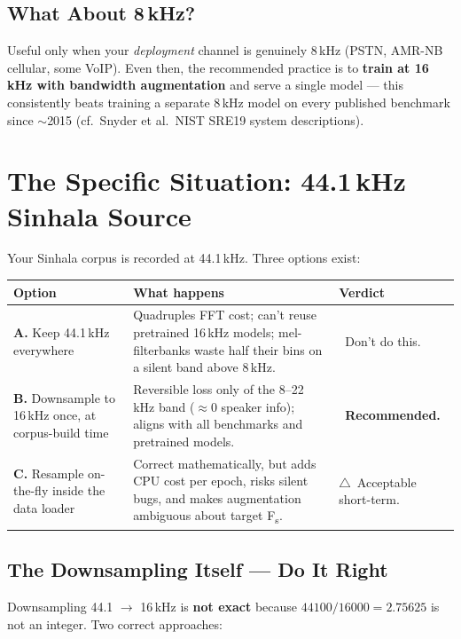 \documentclass[11pt,a4paper]{article}
\newcommand{\yes}{\textcolor{green!60!black}{\checkmark}}
\newcommand{\no}{\textcolor{red}{\texttimes}}
\newcommand{\maybe}{$\triangle$}
\begin{document}
\subsection{What About 8\,kHz?}

Useful only when your \emph{deployment} channel is genuinely 8\,kHz (PSTN, AMR-NB cellular, some
VoIP). Even then, the recommended practice is to \textbf{train at 16\,kHz with bandwidth
augmentation} and serve a single model --- this consistently beats training a separate 8\,kHz model
on every published benchmark since $\sim$2015 (cf.\ Snyder et al.\ NIST SRE19 system descriptions).

\section{The Specific Situation: 44.1\,kHz Sinhala Source}
\label{sec:sinhala}

Your Sinhala corpus is recorded at 44.1\,kHz. Three options exist:

\begin{center}
\begin{tabular}{p{3cm}p{7cm}p{2cm}}
\toprule
Option & What happens & Verdict \\
\midrule
\textbf{A.} Keep 44.1\,kHz everywhere &
  Quadruples FFT cost; can't reuse pretrained 16\,kHz models; mel-filterbanks waste half their bins
  on a silent band above 8\,kHz. &
  \no~Don't do this. \\[4pt]
\textbf{B.} Downsample to 16\,kHz once, at corpus-build time &
  Reversible loss only of the 8--22\,kHz band ($\approx$0 speaker info); aligns with all benchmarks
  and pretrained models. &
  \yes~\textbf{Recommended.} \\[4pt]
\textbf{C.} Resample on-the-fly inside the data loader &
  Correct mathematically, but adds CPU cost per epoch, risks silent bugs, and makes augmentation
  ambiguous about target F\textsubscript{s}. &
  \maybe~Acceptable short-term. \\
\bottomrule
\end{tabular}
\end{center}

\subsection{The Downsampling Itself --- Do It Right}

Downsampling 44.1 $\to$ 16\,kHz is \textbf{not exact} because $44100/16000 = 2.75625$ is not an
integer. Two correct approaches:
\end{document}
